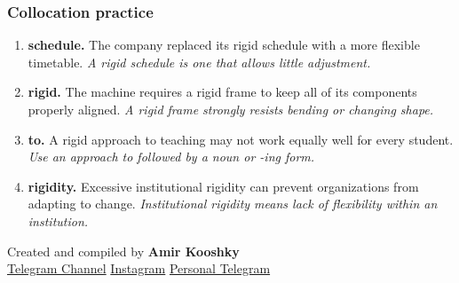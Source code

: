 \documentclass[11pt]{article}
\begin{document}
\subsubsection{Collocation practice}
\begin{enumerate}
  \item \textbf{schedule.} The company replaced its rigid schedule with a more flexible timetable. \emph{A rigid schedule is one that allows little adjustment.}
  \item \textbf{rigid.} The machine requires a rigid frame to keep all of its components properly aligned. \emph{A rigid frame strongly resists bending or changing shape.}
  \item \textbf{to.} A rigid approach to teaching may not work equally well for every student. \emph{Use an approach to followed by a noun or -ing form.}
  \item \textbf{rigidity.} Excessive institutional rigidity can prevent organizations from adapting to change. \emph{Institutional rigidity means lack of flexibility within an institution.}
\end{enumerate}

\vfill
\begin{center}
\small\color{Muted} Created and compiled by \textbf{Amir Kooshky}\\
\href{https://t.me/KooshkyTOEFL}{Telegram Channel}\quad\textbullet\quad
\href{https://www.instagram.com/kooshkytoefl}{Instagram}\quad\textbullet\quad
\href{https://t.me/KooshkyTOEFL\_pv}{Personal Telegram}
\end{center}
\end{document}
